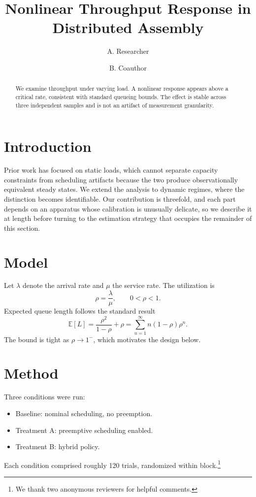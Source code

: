 \documentclass[10pt,twocolumn]{article}
\title{Nonlinear Throughput Response in Distributed Assembly}
\author{A. Researcher \and B. Coauthor}
\date{}
\begin{document}
\maketitle

\begin{abstract}
We examine throughput under varying load. A nonlinear response appears above a
critical rate, consistent with standard queueing bounds. The effect is stable
across three independent samples and is not an artifact of measurement
granularity.
\end{abstract}

\section{Introduction}
Prior work has focused on static loads, which cannot separate capacity
constraints from scheduling artifacts because the two produce observationally
equivalent steady states. We extend the analysis to dynamic regimes, where the
distinction becomes identifiable. Our contribution is threefold, and each part
depends on an apparatus whose calibration is unusually delicate, so we describe
it at length before turning to the estimation strategy that occupies the
remainder of this section.

\section{Model}
Let $\lambda$ denote the arrival rate and $\mu$ the service rate. The
utilization is
\begin{equation}
\rho = \frac{\lambda}{\mu}, \qquad 0 < \rho < 1 .
\end{equation}
Expected queue length follows the standard result
\begin{equation}
\mathbb{E}[L] = \frac{\rho^{2}}{1-\rho} + \rho
  = \sum_{n=1}^{\infty} n (1-\rho)\rho^{n} .
\end{equation}
The bound is tight as $\rho \to 1^{-}$, which motivates the design below.

\section{Method}
Three conditions were run:
\begin{itemize}
  \item Baseline: nominal scheduling, no preemption.
  \item Treatment A: preemptive scheduling enabled.
  \item Treatment B: hybrid policy.
\end{itemize}
Each condition comprised roughly 120 trials, randomized within block.\footnote{We
thank two anonymous reviewers for helpful comments.}
\end{document}
